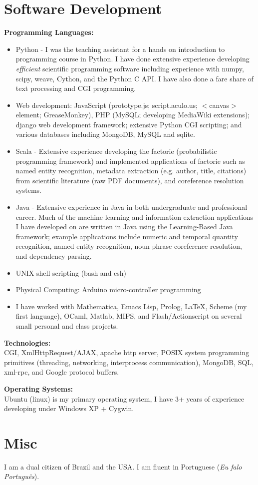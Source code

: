 \documentclass{report}
\begin{document}
\section*{Software Development} 
{\bf Programming Languages:}
\begin{itemize}
\item Python - I was the teaching assistant for a hands on introduction to programming course in Python. I have done extensive experience developing \emph{efficient} scientific programming software including experience with numpy, scipy, weave, Cython, and the Python C API. I have also done a fare share of text processing and CGI programming.
\item Web development: JavaScript (prototype.js; script.aculo.us; $<$canvas$>$ element; GreaseMonkey), PHP (MySQL; developing MediaWiki extensions); django web development framework; extensive Python CGI scripting; and various databases including  MongoDB, MySQL and sqlite.
\item Scala - Extensive experience developing the factorie (probabilistic programming framework) and implemented applications of factorie such as named entity recognition, metadata extraction (e.g. author, title, citations) from scientific literature (raw PDF documents), and coreference resolution systems.
\item Java - Extensive experience in Java in both undergraduate and professional career. Much of the machine learning and information extraction applications I have developed on are written in Java using the Learning-Based Java framework; example applications include numeric and temporal quantity recognition, named entity recognition, noun phrase coreference resolution, and dependency parsing.
\item UNIX shell scripting (bash and csh)
\item Physical Computing: Arduino micro-controller programming
\item I have worked with Mathematica, Emacs Lisp, Prolog, \LaTeX, Scheme (my first language), OCaml, Matlab, MIPS, and Flash/Actionscript on several small personal and class projects.
\end{itemize}

{\bf Technologies:} \\
CGI, XmlHttpRequest/AJAX, apache http server, POSIX system programming primitives (threading, networking, interprocess communication), MongoDB, SQL, xml-rpc, and Google protocol buffers. \\ \vspace{-18pt}
   
{\bf Operating Systems:} \\ 
Ubuntu (linux) is my primary operating system, I have 3+ years of experience developing under Windows XP + Cygwin. \\ 


\section*{Misc}
I am a dual citizen of Brazil and the USA. I am fluent in Portuguese (\emph{Eu falo Portugu\^{e}s}).
\end{document}
